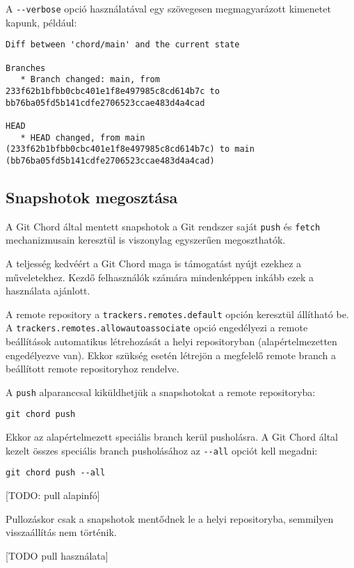 \documentclass[final]{elteikthesis}[2025/03/25]
\begin{document}
A \verb|--verbose| opció használatával egy szövegesen megmagyarázott kimenetet kapunk, például:

\begin{verbatim}
Diff between 'chord/main' and the current state

Branches
   * Branch changed: main, from 233f62b1bfbb0cbc401e1f8e497985c8cd614b7c to bb76ba05fd5b141cdfe2706523ccae483d4a4cad

HEAD
   * HEAD changed, from main (233f62b1bfbb0cbc401e1f8e497985c8cd614b7c) to main (bb76ba05fd5b141cdfe2706523ccae483d4a4cad)
\end{verbatim}

\subsection{Snapshotok megosztása}

A Git Chord által mentett snapshotok a Git rendszer saját \verb|push| és \verb|fetch|
mechanizmusain keresztül is viszonylag egyszerűen megoszthatók.

A teljesség kedvéért a Git Chord maga is támogatást nyújt ezekhez a műveletekhez.
Kezdő felhasználók számára mindenképpen inkább ezek a használata ajánlott.

A remote repository a \verb|trackers.remotes.default| opción keresztül állítható be.
A \verb|trackers.remotes.allowautoassociate| opció engedélyezi a remote beállítások automatikus
létrehozását a helyi repositoryban (alapértelmezetten engedélyezve van).
Ekkor szükség esetén létrejön a megfelelő remote branch a beállított remote repositoryhoz rendelve.

A \verb|push| alparanccsal kiküldhetjük a snapshotokat a remote repositoryba:

\begin{verbatim}
git chord push
\end{verbatim}

Ekkor az alapértelmezett speciális branch kerül pusholásra.
A Git Chord által kezelt összes speciális branch pusholásához
az \verb|--all| opciót kell megadni:

\begin{verbatim}
git chord push --all
\end{verbatim}

[TODO: pull alapinfó]

Pullozáskor csak a snapshotok mentődnek le a helyi repositoryba,
semmilyen visszaállítás nem történik.

[TODO pull használata]
\end{document}
